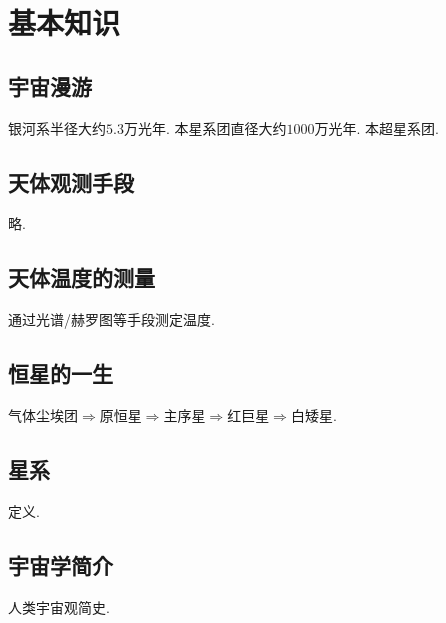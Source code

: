 \documentclass[hidelinks]{ctexart}
\begin{document}
\section{基本知识} %
\label{sec:基本知识}

\subsection{宇宙漫游} %
\label{sub:宇宙漫游}

\newpoint{}银河系半径大约$5.3$万光年.
\newpoint{}本星系团直径大约$1000$万光年.
\newpoint{}本超星系团.


\subsection{天体观测手段} %
\label{sub:天体观测手段}

略.


\subsection{天体温度的测量} %
\label{sub:天体温度的测量}

\newpoint{}通过光谱/赫罗图等手段测定温度.


\subsection{恒星的一生} %
\label{sub:恒星的一生}

气体尘埃团$\Rightarrow $原恒星$\Rightarrow $主序星$\Rightarrow $红巨星$\Rightarrow $白矮星.


\subsection{星系} %
\label{sub:星系}

定义.


\subsection{宇宙学简介} %
\label{sub:宇宙学简介}

人类宇宙观简史.
\end{document}
